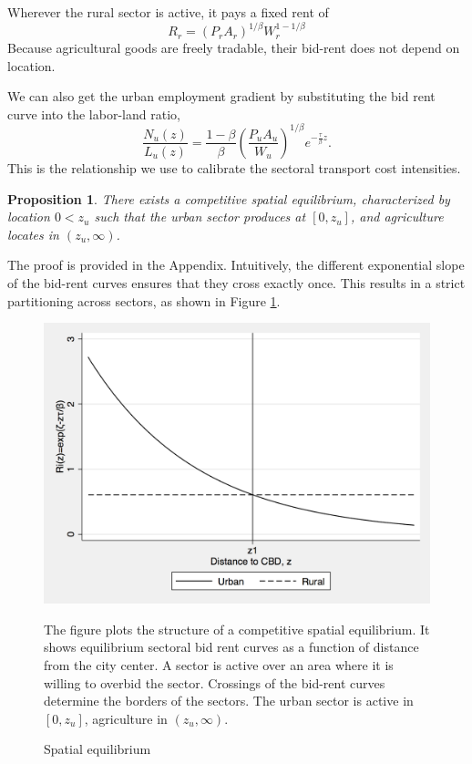\documentclass[12pt]{article}
\newtheorem{proposition}{Proposition}
\begin{document}
Wherever the rural sector is active, it pays a fixed rent of
\[
R_r = (P_rA_r)^{1/\beta} W_r^{1-1/\beta}
\]
Because agricultural goods are freely tradable, their bid-rent does not depend on location.

We can also get the urban employment gradient by substituting the bid rent curve into the labor-land ratio,
\begin{equation}
\label{eq:EmpGrad}
\frac{N_u(z)}{L_u(z)} = \frac{1-\beta}{\beta} \left(\frac{P_uA_u}{W_u}\right)^{1/\beta} e^{-\frac{\tau}{\beta} z}.
\end{equation}
This is the relationship we use to calibrate the sectoral transport cost intensities.

\begin{proposition}\label{prop:existence}
There exists a competitive spatial equilibrium, characterized by location $0<z_u$ such that the urban sector produces at $\left[0,z_u\right]$, and agriculture locates in $(z_u,\infty)$.
\end{proposition}
The proof is provided in the Appendix. Intuitively, the different exponential slope of the bid-rent curves ensures that they cross exactly once. This results in a strict partitioning across sectors, as shown in Figure \ref{fig:BidRent}. 

\begin{figure}[h!]
\caption{Spatial equilibrium\label{fig:BidRent}}
\begin{center}
\includegraphics[scale=0.4]{figures/bid_rent_curves}
\end{center}

\noindent \footnotesize{The figure plots the structure of a competitive spatial equilibrium. It shows equilibrium sectoral bid rent curves as a function of distance from the city center. A sector is active over an area where it is willing to overbid the sector. Crossings of the bid-rent curves determine the borders of the sectors. The urban sector is active in $[0,z_u]$, agriculture in $(z_u,\infty)$.}
\end{figure}
\end{document}
